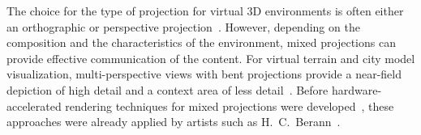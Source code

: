 The choice for the type of projection for virtual 3D environments is often either an orthographic or perspective projection~\cite{Piringer2004}.
However, depending on the composition and the characteristics of the environment, mixed projections can provide effective communication of the content.
For virtual terrain and city model visualization, multi-perspective views with bent projections provide a near-field depiction of high detail and a context area of less detail~\cite{Pasewaldt2011,Roehlig2016}.
Before hardware-accelerated rendering techniques for mixed projections were developed~\cite{Lorenz2008}, these approaches were already applied by artists such as H.~C.~Berann~\cite{Berann1999}.
